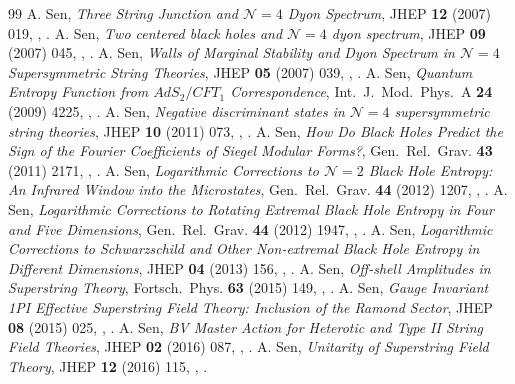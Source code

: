 \begin{thebibliography}{99}
 A. Sen, \emph{Three String Junction and $\mathcal N=4$ Dyon Spectrum}, JHEP \textbf{12} (2007) 019, , .
 A. Sen, \emph{Two centered black holes and $\mathcal N=4$ dyon spectrum}, JHEP \textbf{09} (2007) 045, , .
 A. Sen, \emph{Walls of Marginal Stability and Dyon Spectrum in $\mathcal N=4$ Supersymmetric String Theories}, JHEP \textbf{05} (2007) 039, , .
 A. Sen, \emph{Quantum Entropy Function from $AdS_2/CFT_1$ Correspondence}, Int.\ J.\ Mod.\ Phys.\ A \textbf{24} (2009) 4225, , .
 A. Sen, \emph{Negative discriminant states in $\mathcal N=4$ supersymmetric string theories}, JHEP \textbf{10} (2011) 073, , .
 A. Sen, \emph{How Do Black Holes Predict the Sign of the Fourier Coefficients of Siegel Modular Forms?}, Gen.\ Rel.\ Grav. \textbf{43} (2011) 2171, , .
 A. Sen, \emph{Logarithmic Corrections to $\mathcal N=2$ Black Hole Entropy: An Infrared Window into the Microstates}, Gen.\ Rel.\ Grav. \textbf{44} (2012) 1207, , .
 A. Sen, \emph{Logarithmic Corrections to Rotating Extremal Black Hole Entropy in Four and Five Dimensions}, Gen.\ Rel.\ Grav. \textbf{44} (2012) 1947, , .
 A. Sen, \emph{Logarithmic Corrections to Schwarzschild and Other Non-extremal Black Hole Entropy in Different Dimensions}, JHEP \textbf{04} (2013) 156, , .
 A. Sen, \emph{Off-shell Amplitudes in Superstring Theory}, Fortsch.\ Phys. \textbf{63} (2015) 149, , .
 A. Sen, \emph{Gauge Invariant 1PI Effective Superstring Field Theory: Inclusion of the Ramond Sector}, JHEP \textbf{08} (2015) 025, , .
 A. Sen, \emph{BV Master Action for Heterotic and Type II String Field Theories}, JHEP \textbf{02} (2016) 087, , .
 A. Sen, \emph{Unitarity of Superstring Field Theory}, JHEP \textbf{12} (2016) 115, , .

\end{thebibliography}
